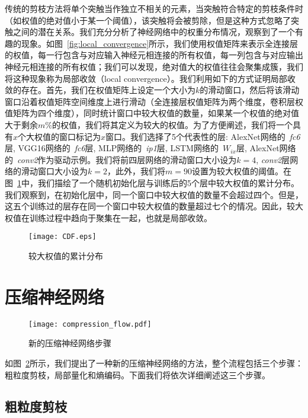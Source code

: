 传统的剪枝方法将单个突触当作独立不相关的元素，当突触符合特定的剪枝条件时（如权值的绝对值小于某一个阈值），该突触将会被剪除，但是这种方式忽略了突触之间的潜在关系。我们充分分析了神经网络中的权重分布情况，观察到了一个有趣的现象。如图~\ref{fig:local_convergence}所示，我们使用权值矩阵来表示全连接层的权值，每一行包含与对应输入神经元相连接的所有权值，每一列包含与对应输出神经元相连接的所有权值；我们可以发现，绝对值大的权值往往会聚集成簇，我们将这种现象称为局部收敛（local convergence）。我们利用如下的方式证明局部收敛的存在。首先，我们在权值矩阵上设定一个大小为$k$的滑动窗口，然后将该滑动窗口沿着权值矩阵空间维度上进行滑动（全连接层权值矩阵为两个维度，卷积层权值矩阵为四个维度），同时统计窗口中较大权值的数量，如果某一个权值的绝对值大于剩余$m\%$的权值，我们将其定义为较大的权值。为了方便阐述，我们将一个具有$x$个大权值的窗口标记为$x$窗口。我们选择了5个代表性的层: AlexNet网络的~\emph{fc6}层, VGG16网络的~\emph{fc6}层, MLP网络的~\emph{ip1}层, LSTM网络的~\emph{$W_{ix}$}层, AlexNet网络的~\emph{conv2}作为驱动示例。我们将前四层网络的滑动窗口大小设为$k = 4$, \emph{conv2}层网络的滑动窗口大小设为$k = 2$，此外，我们将$m = 90$设置为较大权值的阈值。在图~\ref{fig:cdf}中，我们描绘了一个随机初始化层与训练后的5个层中较大权值的累计分布。我们观察到，在初始化层中，同一个窗口中较大权值的数量不会超过四个。但是，这五个训练过的层存在同一个窗口中较大权值的数量超过七个的情况。因此，较大权值在训练过程中趋向于聚集在一起，也就是局部收敛。

\begin{figure}[t]
\centering
\texttt{[image: CDF.eps]}
\caption{较大权值的累计分布}
\label{fig:cdf}
\end{figure}

\section{压缩神经网络}

\begin{figure}[h]
\centering
\texttt{[image: compression\_flow.pdf]}
\caption{新的压缩神经网络步骤}
\label{fig:compression_flow}
\end{figure}

如图~\ref{fig:compression_flow}所示，我们提出了一种新的压缩神经网络的方法，整个流程包括三个步骤：粗粒度剪枝，局部量化和熵编码。下面我们将依次详细阐述这三个步骤。


\subsection{粗粒度剪枝}

